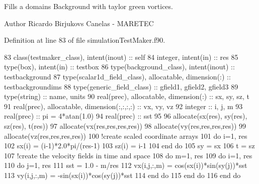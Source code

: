 Fills a domain\textquotesingle{}s Background with taylor green vortices. 

\begin{DoxyAuthor}{Author}
Ricardo Birjukovs Canelas -\/ M\+A\+R\+E\+T\+EC 
\end{DoxyAuthor}


Definition at line 83 of file simulation\+Test\+Maker.\+f90.


\begin{DoxyCode}
83     \textcolor{keywordtype}{class}(testmaker\_class), \textcolor{keywordtype}{intent(inout)} :: self
84     \textcolor{keywordtype}{integer}, \textcolor{keywordtype}{intent(in)} :: res
85     \textcolor{keywordtype}{type}(box), \textcolor{keywordtype}{intent(in)} :: testbox
86     \textcolor{keywordtype}{type}(background\_class), \textcolor{keywordtype}{intent(inout)} :: testbackground
87     \textcolor{keywordtype}{type}(scalar1d\_field\_class), \textcolor{keywordtype}{allocatable}, \textcolor{keywordtype}{dimension(:)} :: testbackgroundims
88     \textcolor{keywordtype}{type}(generic\_field\_class) :: gfield1, gfield2, gfield3
89     \textcolor{keywordtype}{type}(string) :: name, units
90     \textcolor{keywordtype}{real(prec)}, \textcolor{keywordtype}{allocatable}, \textcolor{keywordtype}{dimension(:)} :: sx, sy, sz, t
91     \textcolor{keywordtype}{real(prec)}, \textcolor{keywordtype}{allocatable}, \textcolor{keywordtype}{dimension(:,:,:,:)} :: vx, vy, vz
92     \textcolor{keywordtype}{integer} :: i, j, m
93     \textcolor{keywordtype}{real(prec)} :: pi = 4*atan(1.0)
94     \textcolor{keywordtype}{real(prec)} :: sst
95 
96     \textcolor{keyword}{allocate}(sx(res), sy(res), sz(res), t(res))
97     \textcolor{keyword}{allocate}(vx(res,res,res,res))
98     \textcolor{keyword}{allocate}(vy(res,res,res,res))
99     \textcolor{keyword}{allocate}(vz(res,res,res,res))
100     \textcolor{comment}{!create scaled coordinate arrays}
101     \textcolor{keywordflow}{do} i=1, res
102         sx(i) = (i-1)*2.0*pi/(res-1)
103         sz(i) = i-1
104 \textcolor{keywordflow}{    end do}
105     sy = sx
106     t = sz
107     \textcolor{comment}{!create the velocity fields in time and space}
108     \textcolor{keywordflow}{do} m=1, res
109         \textcolor{keywordflow}{do} i=1, res
110             \textcolor{keywordflow}{do} j=1, res
111                 sst = 1.0 - m/res
112                 vx(i,j,:,m) = cos(sx(i))*sin(sy(j))*sst
113                 vy(i,j,:,m) = -sin(sx(i))*cos(sy(j))*sst
114 \textcolor{keywordflow}{            end do}
115 \textcolor{keywordflow}{        end do}
116 \textcolor{keywordflow}{    end do}

\end{DoxyCode}
